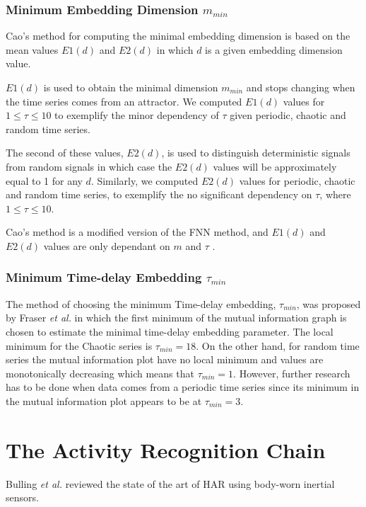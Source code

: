 \documentclass[10pt,journal,compsoc]{IEEEtran}
\begin{document}
\subsubsection{Minimum Embedding Dimension $m_{min}$}
Cao's method \cite{Cao1997} for computing the minimal embedding dimension is based on 
the mean values $E1(d)$ and $E2(d)$ in which $d$ is a given embedding dimension value.

$E1(d)$ is used to obtain the minimal dimension $m_{min}$ and stops changing 
when the time series comes from an attractor.
We computed $E1(d)$ values for $1 \leq \tau \leq 10$ to exemplify 
the minor dependency of $\tau$ given periodic, chaotic and random time series.

The second of these values, $E2(d)$, is used to distinguish 
deterministic signals from random signals in which case the $E2(d)$ values will be approximately 
equal to 1 for any $d$.
Similarly, we computed $E2(d)$ values for periodic, chaotic and random time series,
to exemplify the no significant dependency on $\tau$, where $1 \leq \tau \leq 10$.

Cao's method is a modified version of the FNN method, and $E1(d)$ and 
$E2(d)$ values are only dependant on $m$ and $\tau$ \cite{Cao1997}.

\subsubsection{Minimum Time-delay Embedding  $\tau_{min}$}
The method of choosing the minimum Time-delay embedding, $\tau_{min}$, was proposed 
by Fraser \emph{et al.}  in which the first minimum of the mutual 
information graph is chosen to estimate the minimal time-delay embedding parameter.
The local minimum for the Chaotic series is $\tau_{min} = 18$.
On the other hand, for random time series the mutual information plot have no local minimum 
and values are monotonically decreasing which means that $\tau_{min} = 1$.
However, further research has to be done when data comes from a periodic time series 
since its minimum in the mutual information plot appears to be at $\tau_{min} = 3$.

\section{The Activity Recognition Chain}

Bulling \emph{et al.} \cite{bulling2014} reviewed the state of the art of
HAR using body-worn inertial sensors.
\end{document}

